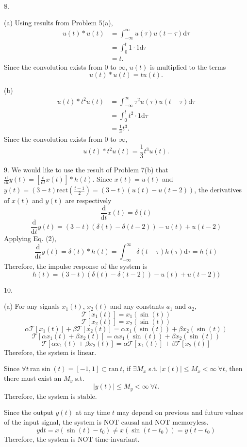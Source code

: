 \documentclass[a4paper]{article}
\begin{document}
8.

(a) Using results from Problem 5(a),
\begin{align*}
    u(t)*u(t)&=\int_{-\infty}^\infty u(\tau)u(t-\tau)\mathrm{d}\tau\\
    &=\int_0^t1\cdot1\mathrm{d}\tau\\
    &=t.
\end{align*}
Since the convolution exists from 0 to $\infty$, $u(t)$ is multiplied to the terms
$$\boxed{u(t)*u(t)=tu(t).}$$

(b)
\begin{align*}
    u(t)*t^2u(t)&=\int_{-\infty}^\infty \tau^2u(\tau)u(t-\tau)\mathrm{d}\tau\\
    &=\int_0^tt^2\cdot1\mathrm{d}\tau\\
    &=\frac{1}{3}t^3.
\end{align*}
Since the convolution exists from 0 to $\infty$,
$$\boxed{u(t)*t^2u(t)=\frac{1}{3}t^3u(t).}$$

9. We would like to use the result of Problem 7(b) that $\frac{\mathrm{d}}{\mathrm{d}t}y(t)=[\frac{\mathrm{d}}{\mathrm{d}t}x(t)]*h(t)$. Since $x(t)=u(t)$ and $y(t)=(3-t)\text{rect}(\frac{t-1}{2})=(3-t)(u(t)-u(t-2))$, the derivatives of $x(t)$ and $y(t)$ are respectively
$$\frac{\mathrm{d}}{\mathrm{d}t}x(t)=\delta(t)$$
$$\frac{\mathrm{d}}{\mathrm{d}t}y(t)=(3-t)(\delta(t)-\delta(t-2))-u(t)+u(t-2)$$
Applying Eq. (2),
$$\frac{\mathrm{d}}{\mathrm{d}t}y(t)=\delta(t)*h(t)=\int_{-\infty}^\infty\delta(t-\tau)h(\tau)\mathrm{d}\tau=h(t)$$
Therefore, the impulse response of the system is
$$\boxed{h(t)=(3-t)(\delta(t)-\delta(t-2))-u(t)+u(t-2))}$$

10.

(a) For any signals $x_1(t)$, $x_2(t)$ and any constants $a_1$ and $a_2$,
$$\mathcal{T}[x_1(t)]=x_1(\sin(t))$$
$$\mathcal{T}[x_2(t)]=x_2(\sin(t))$$
$$\alpha\mathcal{T}[x_1(t)]+\beta\mathcal{T}[x_2(t)]=\alpha x_1(\sin(t))+\beta x_2(\sin(t))$$
$$\mathcal{T}[\alpha x_1(t)+\beta x_2(t)]=\alpha x_1(\sin(t))+\beta x_2(\sin(t))$$
$$\mathcal{T}[\alpha x_1(t)+\beta x_2(t)]=\alpha\mathcal{T}[x_1(t)]+\beta\mathcal{T}[x_2(t)]$$
Therefore, the system is $\boxed{\text{linear}}$.

Since $\forall t\ \mathrm{ran}\sin(t)=[-1,1]\subset\mathrm{ran}\ t$, if $\exists M_x$ s.t. $|x(t)|\leq M_x<\infty\ \forall t$, then there must exist an $M_y$ s.t.
$$|y(t)|\leq M_y<\infty\ \forall t.$$
Therefore, the system is $\boxed{\text{stable}}$.

Since the output $y(t)$ at any time $t$ may depend on previous and future values of the input signal, the system is $\boxed{\text{NOT causal}}$ and $\boxed{\text{NOT memoryless}}$.
$$y\mathrm{d}t=x(\sin(t)-t_0)\neq x(\sin(t-t_0))=y(t-t_0)$$
Therefore, the system is $\boxed{\text{NOT time-invariant}}$.
\end{document}
